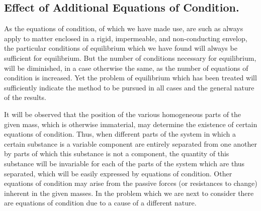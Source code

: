 \documentclass[12pt]{memoir}
\begin{document}
\subsection{Effect of Additional Equations of Condition.}

As the equations of condition, of which we have made use, are such as always apply to matter enclosed in a rigid, impermeable, and non-conducting envelop, the particular conditions of equilibrium which we have found will always be sufficient for equilibrium. But the number of conditions necessary for equilibrium, will be diminished, in a case otherwise the same, as the number of equations of condition is increased. Yet the problem of equilibrium which has been treated will sufficiently indicate the method to be pursued in all cases and the general nature of the results.

It will be observed that the position of the various homogeneous parts of the given mass, which is otherwise immaterial, may determine the existence of certain equations of condition. Thus, when different parts of the system in which a certain substance is a variable component are entirely separated from one another by parts of which this substance is not a component, the quantity of this substance will be invariable for each of the parts of the system which are thus separated, which will be easily expressed by equations of condition. Other equations of condition may arise from the passive forces (or resistances to change) inherent in the given masses. In the problem which we are next to consider there are equations of condition due to a cause of a different nature.
\end{document}
